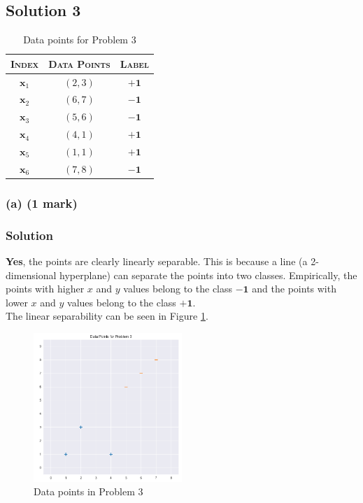 \documentclass[12pt]{article}
\begin{document}
    \subsection*{Solution 3}
    \begin{table}[htbp]
        \centering
        \begin{tabular}{cc|c}
            \textsc{Index} & \textsc{Data Points} & \textsc{Label} \\
            \hline
            $\mathbf{x}_{1}$ & $(2, 3)$ & $\mathbf{+1}$ \\
            $\mathbf{x}_{2}$ & $(6, 7)$ & $\mathbf{-1}$ \\
            $\mathbf{x}_{3}$ & $(5, 6)$ & $\mathbf{-1}$ \\
            $\mathbf{x}_{4}$ & $(4, 1)$ & $\mathbf{+1}$ \\
            $\mathbf{x}_{5}$ & $(1, 1)$ & $\mathbf{+1}$ \\
            $\mathbf{x}_{6}$ & $(7, 8)$ & $\mathbf{-1}$ \\
        \end{tabular}
        \caption{Data points for Problem 3}
        \label{tab:prob3}
    \end{table}

    \subsubsection*{(a) (1 mark)}
    \subsubsection*{Solution}
    \textbf{Yes}, the points are clearly linearly separable. This is because a line
    (a 2-dimensional hyperplane) can separate the points into two classes. Empirically,
    the points with higher $x$ and $y$ values belong to the class $\mathbf{-1}$ and the points
    with lower $x$ and $y$ values belong to the class $\mathbf{+1}$. \\
    The linear separability can be seen in Figure \ref{fig:prob3}.
    \begin{figure}[htbp]
        \centering
        \includegraphics[width=0.5\textwidth]{../Assets/points.png}
        \caption{Data points in Problem 3}
        \label{fig:prob3}
    \end{figure}
\end{document}
